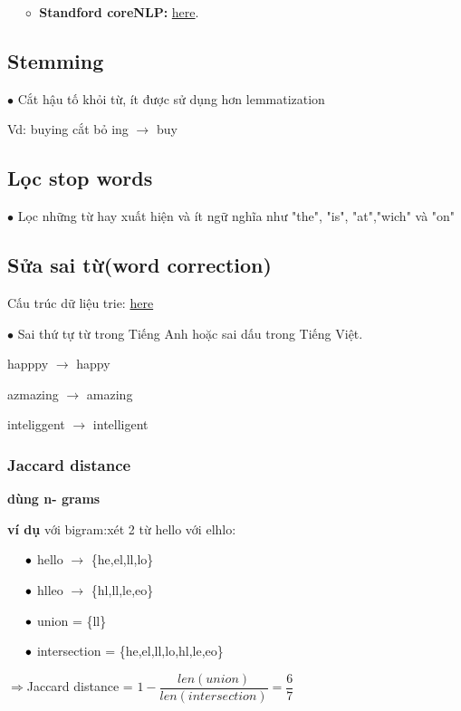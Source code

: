 \documentclass[final,letterpaper,twoside,12pt]{report}
\begin{document}
$\hspace*{0.5cm} \circ$\ \textbf{Standford coreNLP: }\href{https://textblob.readthedocs.io/en/dev/}{here}.

\subsection{Stemming}

$\bullet$ Cắt hậu tố khỏi từ, ít được sử dụng hơn lemmatization

Vd: buying cắt bỏ ing $\rightarrow$ buy

\subsection{Lọc stop words}

$\bullet$ Lọc những từ hay xuất hiện và ít ngữ nghĩa như "the", "is", "at","wich" và "on"

\subsection{Sửa sai từ(word correction) }
Cấu trúc dữ liệu trie:  \href{https://www.geeksforgeeks.org/trie-insert-and-search/}{here}

$\bullet$ Sai thứ tự từ trong Tiếng Anh hoặc sai dấu trong Tiếng Việt.

happpy $\longrightarrow$ happy

azmazing $\longrightarrow$ amazing

inteliggent $\longrightarrow$ intelligent
\subsubsection{Jaccard distance}

\textbf{dùng n- grams}

\textbf{ví dụ} với bigram:xét 2 từ hello với elhlo:

$\hspace*{0.5cm}\bullet$ hello $\rightarrow$ \{he,el,ll,lo\}

$\hspace*{0.5cm}\bullet$ hlleo $\rightarrow$ \{hl,ll,le,eo\}

$\hspace*{0.5cm}\bullet$ union  = \{ll\}

$\hspace*{0.5cm}\bullet$ intersection = \{he,el,ll,lo,hl,le,eo\}

$\Longrightarrow$Jaccard distance = $1- \dfrac{len(union)}{len(intersection)} = \dfrac{6}{7}$
\end{document}
